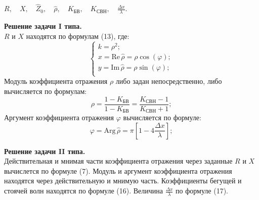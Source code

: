 \documentclass[12pt,a4paper]{article}
\begin{document}
\begin{minipage}{0.5\textwidth}
		\begin{center}
			$\displaystyle R, \quad X, \quad \hat{Z}_0, \quad \hat{\rho}, \quad K_{\text{БВ}}, \quad
			K_{\text{СВН}}, \quad \frac{\Delta x}{\lambda}.$
		\end{center}
		\textbf{Решение задачи I типа.} \\
		$R$ и $X$ находятся по формулам (13), где:
		\begin{equation}
			\begin{cases}
				k = {\rho}^2; \\
				x = \mathrm{Re}\,\hat{\rho} = \rho \cos(\varphi); \\
				y = \mathrm{Im}\,\hat{\rho} = \rho \sin(\varphi); \\
			\end{cases}
		\end{equation}
		Модуль коэффициента отражения $\rho$ либо задан непосредственно, либо вычисляется по формулам:
		\begin{equation}
			\rho = \displaystyle \frac{1-K_{\text{БВ}}}{1-K_{\text{БВ}}} =
			\displaystyle \frac{K_{\text{СВН}}-1}{K_{\text{СВН}}+1};
		\end{equation}
		Аргумент коэффициента отражения $\varphi$ вычисляется по формуле:
		\begin{equation}
			\varphi = \mathrm{Arg}\,\hat{\rho} = \pi \left[ 1 - 4\displaystyle\frac{\Delta x}{\lambda} \right];
		\end{equation}
	\end{minipage}
	\newpage
	\thispagestyle{empty}
	\begin{minipage}{0.5\textwidth}
		\textbf{Решение задачи II типа.} \\
		Действительная и мнимая части коэффициента отражения через заданные $R$ и $X$
		вычислется по формуле (7).
		Модуль и аргумент коэффициента отражения находятся через действительную и мнимую часть.
		Коэффициенты бегущей и стоячей волн находятся по формуле (16). Величина 
		$\displaystyle\frac{\Delta x}{\lambda}$ по формуле (17).
	\end{minipage}
\end{document}
